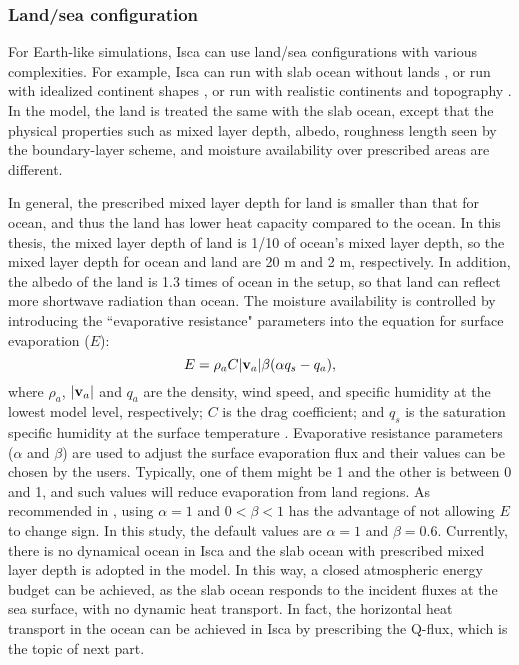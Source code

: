 
\subsubsection{Land/sea configuration}

For Earth-like simulations, Isca can use land/sea configurations with various complexities. For example, Isca can run with slab ocean without lands \citep[aquaplanet setup; e.g.,][]{Geen2018regime,Geen2019processes}, or run with idealized continent shapes \citep[e.g.,][]{Pietschnig2019}, or run with realistic continents and topography \citep[e.g.,][]{Geen2018regime}. In the model, the land is treated the same with the slab ocean, except that the physical properties such as mixed layer depth, albedo, roughness length seen by the boundary-layer scheme, and moisture availability over prescribed areas are different.

In general, the prescribed mixed layer depth for land is smaller than  that for ocean, and thus the land has lower heat capacity compared to the ocean. In this thesis, the mixed layer depth of land is 1/10 of ocean's mixed layer depth, so the mixed layer depth for ocean and land are 20 m and 2 m, respectively. In addition, the albedo of the land is 1.3 times of ocean in the setup, so that land can reflect more shortwave radiation than ocean. The moisture availability is controlled by introducing the ``evaporative resistance" parameters into the equation for surface evaporation ($E$):
\begin{equation}
    E = \rho_a C|\bold{v}_a|\beta(\alpha q_s - q_a),
\end{equation}
where $\rho_a$, $|\bold{v}_a|$ and $q_a$ are the density, wind speed, and specific humidity at the lowest model level, respectively; $C$ is the drag coefficient; and $q_s$ is the saturation specific humidity at the surface temperature \citep{Frierson2006}. Evaporative resistance parameters ($\alpha$ and $\beta$) are used to adjust the surface evaporation flux and their values can be chosen by the users. Typically, one of them might be 1 and the other is between 0 and 1, and such values will reduce evaporation from land regions. As recommended in \cite{Vallis2018}, using $\alpha=1$ and $0<\beta<1$ has the advantage of not allowing $E$ to change sign. In this study, the default values are $\alpha=1$ and $\beta=0.6$. Currently, there is no dynamical ocean in Isca and the slab ocean with prescribed mixed layer depth is adopted in the model. In this way, a closed atmospheric energy budget can be achieved, as the slab ocean responds to the incident fluxes at the sea surface, with no dynamic heat transport. In fact, the horizontal heat transport in the ocean can be achieved in Isca by prescribing the Q-flux, which is the topic of next part.

